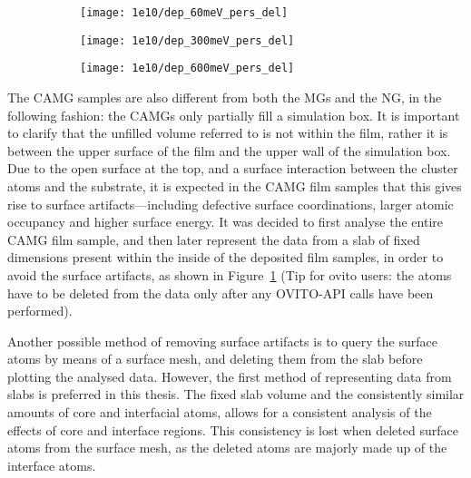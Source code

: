 \begin{selfcite}
\begin{figure}
	\begin{subfigure}[b]{0.33\textwidth} \texttt{[image: 1e10/dep\_60meV\_pers\_del]}
		\caption{}
	\end{subfigure}%
	\hfill
	\begin{subfigure}[b]{0.33\textwidth} \texttt{[image: 1e10/dep\_300meV\_pers\_del]}
		\caption{}
	\end{subfigure}%
	\hfill
	\begin{subfigure}[b]{0.33\textwidth} \texttt{[image: 1e10/dep\_600meV\_pers\_del]}
		\caption{}
	\end{subfigure}%
\label{f:camg_slabs}
\end{figure}

The CAMG samples are also different from both the MGs and the NG, in the following fashion: the CAMGs only partially fill a simulation box. It is important to clarify that the unfilled volume referred to is not within the film, rather it is between the upper surface of the film and the upper wall of the simulation box. Due to the open surface at the top, and a surface interaction between the cluster atoms and the substrate, it is expected in the CAMG film samples that this gives rise to surface artifacts—including defective surface coordinations, larger atomic occupancy and higher surface energy. It was decided to first analyse the entire CAMG film sample, and then later represent the data from a slab of fixed dimensions present within the inside of the deposited film samples, in order to avoid the surface artifacts, as shown in Figure~\ref{f:camg_slabs} (Tip for \gls{ovito} users: the atoms have to be deleted from the data only after any OVITO-API calls have been performed).  \par
\end{selfcite}

Another possible method of removing surface artifacts is to query the surface atoms by means of a surface mesh, and deleting them from the slab before plotting the analysed data. However, the first method of representing data from slabs is preferred in this thesis. The fixed slab volume and the consistently similar amounts of core and interfacial atoms, allows for a consistent analysis of the effects of core and interface regions. This consistency is lost when deleted surface atoms from the surface mesh, as the deleted atoms are majorly made up of the interface atoms. \par

